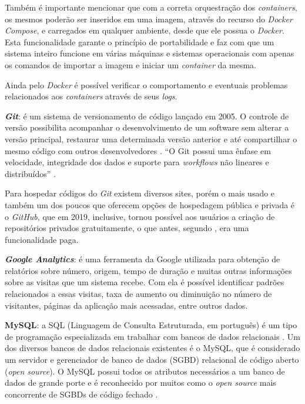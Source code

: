Também é importante mencionar que com a correta orquestração dos \textit{containers}, os mesmos poderão ser inseridos em uma imagem, através do recurso do \textit{Docker Compose}, e carregados em qualquer ambiente, desde que ele possua o \textit{Docker}. Esta funcionalidade garante o princípio de portabilidade e faz com que um sistema inteiro funcione em várias máquinas e sistemas operacionais com apenas os comandos de importar a imagem e iniciar um \textit{container} da mesma.

Ainda pelo \textit{Docker} é possível verificar o comportamento e eventuais problemas relacionados aos \textit{containers} através de seus \textit{logs}.

\textbf{\textit{Git}}: é um sistema de versionamento de código lançado em 2005. O controle de versão possibilita acompanhar o desenvolvimento de um
software sem alterar a versão principal, restaurar uma determinada versão anterior e até compartilhar o mesmo código com outros desenvolvedores \cite{palestinoestudo}. ``O Git possui uma ênfase em velocidade, integridade dos dados e suporte para \textit{workflows} não lineares e distribuídos'' \cite[p. 10]{ghezzi2015api}.

Para hospedar códigos do \textit{Git} existem diversos sites, porém o mais usado e também um dos poucos que oferecem opções de hospedagem pública e privada é o \textit{GitHub}, que em 2019, inclusive, tornou possível aos usuários a criação de repositórios privados gratuitamente, o que antes, segundo , era uma funcionalidade paga. 

\textbf{\textit{Google Analytics}}: é uma ferramenta da Google utilizada para obtenção de relatórios sobre número, origem, tempo de duração e muitas outras informações sobre as visitas que um sistema recebe. Com ela é possível identificar padrões relacionados a essas visitas, taxa de aumento ou diminuição no número de visitantes, páginas da aplicação mais acessadas, entre outros dados. 

\textbf{MySQL}: a SQL (Linguagem de Consulta Estruturada, em português) é um tipo de programação especializada em trabalhar com bancos de dados relacionais \cite[~p. 7, tradução nossa]{mysql2001mysql}. Um dos diversos bancos de dados relacionais existentes é o MySQL, que é considerado um servidor e gerenciador de banco de dados (SGBD) relacional de código aberto (\textit{open source}). O MySQL possui todos os atributos necessários a um banco de dados de grande porte e é reconhecido por muitos como o \textit{open source} mais concorrente de SGBDs de código fechado \cite{milani2007mysql}.



